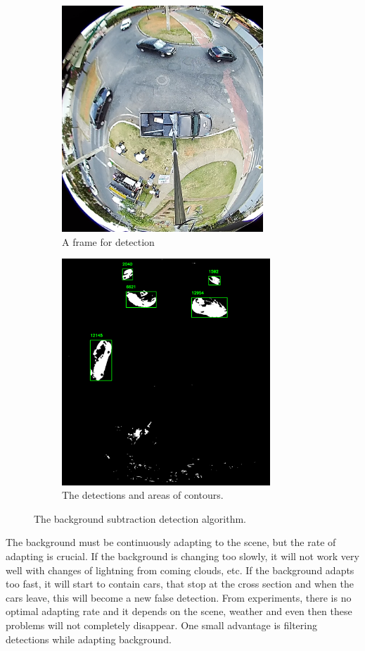 \documentclass[a4paper,12pt,titlepage]{article}
\numberwithin{figure}{section}
\begin{document}
\begin{figure}
    \begin{subfigure}[Sample1]{0.5\linewidth}
    	\includegraphics[height=85mm]{fig/frame_cropped.png} 
        \caption{A frame for detection}
        \label{fig:frame_for_detection}   
    \end{subfigure}
    \qquad
    \begin{subfigure}[Sample1]{0.5\linewidth} 
    	\includegraphics[height=85mm]{fig/mask_area.png}
        \caption{The detections and areas of contours.}   
        \label{fig:mask_area}
    \end{subfigure} 
    \caption{The background subtraction detection algorithm.}
\end{figure}

The background must be continuously adapting to the scene, but the rate of adapting is crucial. If the background is changing too slowly, it will not work very well with changes of lightning from coming clouds, etc. If the background adapts too fast, it will start to contain cars, that stop at the cross section and when the cars leave, this will become a new false detection. From experiments, there is no optimal adapting rate and it depends on the scene, weather and even then these problems will not completely disappear. One small advantage is filtering detections while adapting background.
\end{document}
